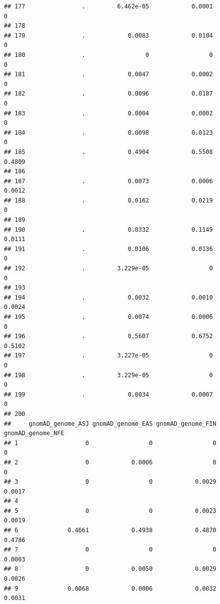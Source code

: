 \documentclass[
]{article}
\begin{document}
\begin{verbatim}
## 177                .         6.462e-05            0.0001                 0
## 178                                                                       
## 179                .            0.0083            0.0104                 0
## 180                .                 0                 0                 0
## 181                .            0.0047            0.0002                 0
## 182                .            0.0096            0.0187                 0
## 183                .            0.0004            0.0002                 0
## 184                .            0.0098            0.0123                 0
## 185                .            0.4904            0.5508            0.4809
## 186                                                                       
## 187                .            0.0073            0.0006            0.0012
## 188                .            0.0162            0.0219                 0
## 189                                                                       
## 190                .            0.0332            0.1149            0.0111
## 191                .            0.0106            0.0136                 0
## 192                .         3.229e-05                 0                 0
## 193                                                                       
## 194                .            0.0032            0.0010            0.0024
## 195                .            0.0074            0.0006                 0
## 196                .            0.5607            0.6752            0.5102
## 197                .         3.227e-05                 0                 0
## 198                .         3.229e-05                 0                 0
## 199                .            0.0034            0.0007                 0
## 200                                                                       
##     gnomAD_genome_ASJ gnomAD_genome_EAS gnomAD_genome_FIN gnomAD_genome_NFE
## 1                   0                 0                 0                 0
## 2                   0            0.0006                 0                 0
## 3                   0                 0            0.0029            0.0017
## 4                                                                          
## 5                   0                 0            0.0023            0.0019
## 6              0.4661            0.4938            0.4870            0.4786
## 7                   0                 0                 0            0.0003
## 8                   0            0.0050            0.0029            0.0026
## 9              0.0068            0.0006            0.0032            0.0031

\end{verbatim}
\end{document}
